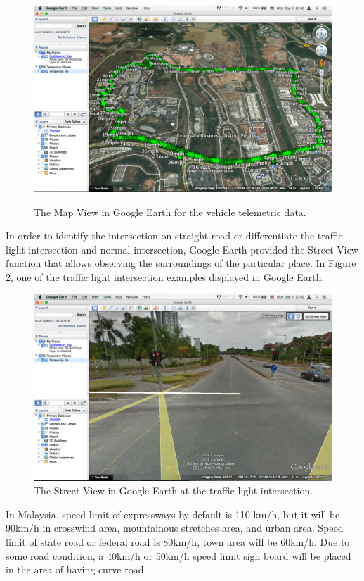 \begin{figure}[hbt!]\centering
\includegraphics[width=.75\textwidth]{image/GEMapView}
\label{fig:GEMap}
\caption{The Map View in Google Earth for the vehicle telemetric data.}
\end{figure}

In order to identify the intersection on straight road or differentiate the traffic light intersection and normal intersection, Google Earth provided the Street View function that allows observing the surroundings of the particular place. In Figure \ref{fig:GEStreet}, one of the traffic light intersection examples displayed in Google Earth. 

\begin{figure}[hbt!]\centering
\includegraphics[width=.75\textwidth]{image/GEStreetView}
\caption{The Street View in Google Earth at the traffic light intersection.}
\label{fig:GEStreet}
\end{figure}

In Malaysia, speed limit of expressways by default is 110 km/h, but it will be 90km/h in crosswind area, mountainous stretches area, and urban area. Speed limit of state road or federal road is 80km/h, town area will be 60km/h. Due to some road condition, a 40km/h or 50km/h speed limit sign board will be placed in the area of having curve road. 

